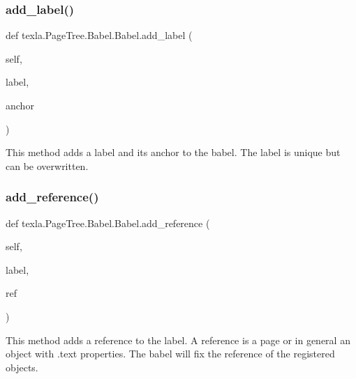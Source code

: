 \subsubsection{\texorpdfstring{add\+\_\+label()}{add\_label()}}
{\footnotesize\ttfamily def texla.\+Page\+Tree.\+Babel.\+Babel.\+add\+\_\+label (\begin{DoxyParamCaption}\item[{}]{self,  }\item[{}]{label,  }\item[{}]{anchor }\end{DoxyParamCaption})}

\begin{DoxyVerb}This method adds a label and its anchor to the
babel. The label is unique but can be overwritten.
\end{DoxyVerb}
 \hypertarget{classtexla_1_1PageTree_1_1Babel_1_1Babel_a9fa3d1d8628ea14de175e506640bc160}{}\label{classtexla_1_1PageTree_1_1Babel_1_1Babel_a9fa3d1d8628ea14de175e506640bc160} 
\subsubsection{\texorpdfstring{add\+\_\+reference()}{add\_reference()}}
{\footnotesize\ttfamily def texla.\+Page\+Tree.\+Babel.\+Babel.\+add\+\_\+reference (\begin{DoxyParamCaption}\item[{}]{self,  }\item[{}]{label,  }\item[{}]{ref }\end{DoxyParamCaption})}

\begin{DoxyVerb}This method adds a reference to the label.
A reference is a page or in general an object
with .text properties. The babel will fix the reference
of the registered objects.
\end{DoxyVerb}
 \hypertarget{classtexla_1_1PageTree_1_1Babel_1_1Babel_a1d4846dd94d6c4c272303703b7438f9e}{}\label{classtexla_1_1PageTree_1_1Babel_1_1Babel_a1d4846dd94d6c4c272303703b7438f9e} 
